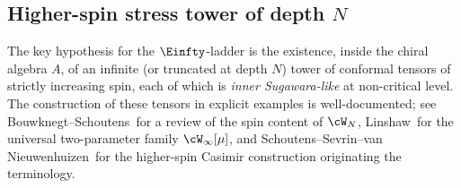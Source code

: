 \subsection{Higher-spin stress tower of depth \texorpdfstring{$N$}{N}}
\label{subsec:higher-spin-stress-tower}

The key hypothesis for the $\Einfty$-ladder is the existence, inside the
chiral algebra $A$, of an infinite (or truncated at depth $N$) tower of
conformal tensors of strictly increasing spin, each of which is
\emph{inner Sugawara-like} at non-critical level. The construction of
these tensors in explicit examples is well-documented; see
Bouwknegt--Schoutens\,\cite{BMP-Wsymmetry} for a review of the spin
content of $\cW_N$, Linshaw\,\cite{Linshaw-Winfty} for the universal
two-parameter family $\cW_\infty[\mu]$, and
Schoutens--Sevrin--van Nieuwenhuizen\,\cite{Schoutens-higher-spin-Sugawara}
for the higher-spin Casimir construction originating the terminology.

